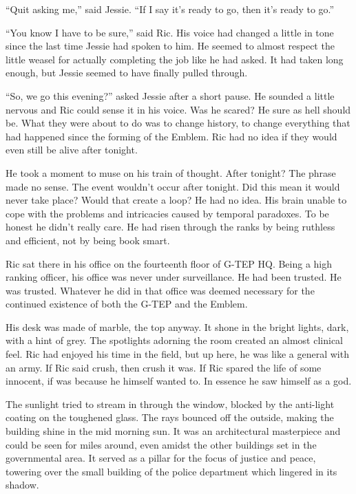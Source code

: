 ``Quit asking me,'' said Jessie.  ``If I say it's ready to go, then it's ready to go.''

``You know I have to be sure,'' said Ric.  His voice had changed a little in tone since the last time Jessie had spoken to him.  He seemed to almost respect the little weasel for actually completing the job like he had asked.  It had taken long enough, but Jessie seemed to have finally pulled through.

``So, we go this evening?'' asked Jessie after a short pause.  He sounded a little nervous and Ric could sense it in his voice.  Was he scared?  He sure as hell should be.  What they were about to do was to change history, to change everything that had happened since the forming of the Emblem.  Ric had no idea if they would even still be alive after tonight.

He took a moment to muse on his train of thought.  After tonight?   The phrase made no sense.  The event wouldn't occur after tonight.  Did this mean it would never take place?  Would that create a loop?  He had no idea.  His brain unable to cope with the problems and intricacies caused by temporal paradoxes.  To be honest he didn't really care.  He had risen through the ranks by being ruthless and efficient, not by being book smart.

Ric sat there in his office on the fourteenth floor of G-TEP HQ.  Being a high ranking officer, his office was never under surveillance.  He had been trusted.  He was trusted.  Whatever he did in that office was deemed necessary for the continued existence of both the G-TEP and the Emblem.  

His desk was made of marble, the top anyway.  It shone in the bright lights, dark, with a hint of grey.  The spotlights adorning the room created an almost clinical feel.  Ric had enjoyed his time in the field, but up here, he was like a general with an army.  If Ric said crush, then crush it was.  If Ric spared the life of some innocent, if was because he himself wanted to.  In essence he saw himself as a god.

The sunlight tried to stream in through the window, blocked by the anti-light coating on the toughened glass.  The rays bounced off the outside, making the building shine in the mid morning sun.  It was an architectural masterpiece and could be seen for miles around, even amidst the other buildings set in the governmental area.  It served as a pillar for the focus of justice and peace, towering over the small building of the police department which lingered in its shadow.

